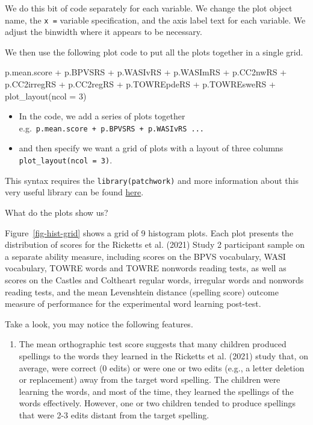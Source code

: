 \documentclass[
  letterpaper,
  DIV=11,
  numbers=noendperiod]{scrreprt}
\newenvironment{Shaded}{\begin{snugshade}}{\end{snugshade}}
\newcommand{\AttributeTok}[1]{\textcolor[rgb]{0.40,0.45,0.13}{#1}}
\newcommand{\DecValTok}[1]{\textcolor[rgb]{0.68,0.00,0.00}{#1}}
\newcommand{\FunctionTok}[1]{\textcolor[rgb]{0.28,0.35,0.67}{#1}}
\newcommand{\NormalTok}[1]{\textcolor[rgb]{0.00,0.23,0.31}{#1}}
\newcommand{\SpecialCharTok}[1]{\textcolor[rgb]{0.37,0.37,0.37}{#1}}
\providecommand{\tightlist}{%
  \setlength{\itemsep}{0pt}\setlength{\parskip}{0pt}}\usepackage{longtable,booktabs,array}
\begin{document}
We do this bit of code separately for each variable. We change the plot
object name, the \texttt{x\ =} variable specification, and the axis
label text for each variable. We adjust the binwidth where it appears to
be necessary.

We then use the following plot code to put all the plots together in a
single grid.

\begin{Shaded}
\begin{Highlighting}[]
\NormalTok{p.mean.score }\SpecialCharTok{+}\NormalTok{ p.BPVSRS }\SpecialCharTok{+}\NormalTok{ p.WASIvRS }\SpecialCharTok{+}\NormalTok{ p.WASImRS }\SpecialCharTok{+}
\NormalTok{  p.CC2nwRS }\SpecialCharTok{+}\NormalTok{ p.CC2irregRS }\SpecialCharTok{+}\NormalTok{ p.CC2regRS }\SpecialCharTok{+} 
\NormalTok{  p.TOWREpdeRS }\SpecialCharTok{+}\NormalTok{ p.TOWREsweRS }\SpecialCharTok{+} \FunctionTok{plot\_layout}\NormalTok{(}\AttributeTok{ncol =} \DecValTok{3}\NormalTok{)}
\end{Highlighting}
\end{Shaded}

\begin{itemize}
\tightlist
\item
  In the code, we add a series of plots together
  e.g.~\texttt{p.mean.score\ +\ p.BPVSRS\ +\ p.WASIvRS\ ...}
\item
  and then specify we want a grid of plots with a layout of three
  columns \texttt{plot\_layout(ncol\ =\ 3)}.
\end{itemize}

This syntax requires the \texttt{library(patchwork)} and more
information about this very useful library can be found
\href{https://patchwork.data-imaginist.com}{here}.

What do the plots show us?

Figure~\ref{fig-hist-grid} shows a grid of 9 histogram plots. Each plot
presents the distribution of scores for the Ricketts et al. (2021) Study
2 participant sample on a separate ability measure, including scores on
the BPVS vocabulary, WASI vocabulary, TOWRE words and TOWRE nonwords
reading tests, as well as scores on the Castles and Coltheart regular
words, irregular words and nonwords reading tests, and the mean
Levenshtein distance (spelling score) outcome measure of performance for
the experimental word learning post-test.

Take a look, you may notice the following features.

\begin{enumerate}
\def\labelenumi{\arabic{enumi}.}
\tightlist
\item
  The mean orthographic test score suggests that many children produced
  spellings to the words they learned in the Ricketts et al. (2021)
  study that, on average, were correct (0 edits) or were one or two
  edits (e.g., a letter deletion or replacement) away from the target
  word spelling. The children were learning the words, and most of the
  time, they learned the spellings of the words effectively. However,
  one or two children tended to produce spellings that were 2-3 edits
  distant from the target spelling.
\end{enumerate}
\end{document}
